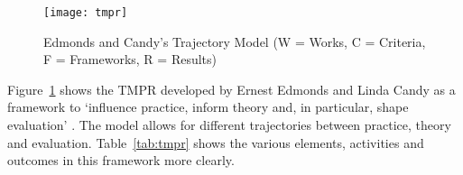 


\begin{figure}[!htbp] %
  \centering
  \texttt{[image: tmpr]}
  \caption[Trajectory Model]{Edmonds and Candy's Trajectory Model (W = Works, C = Criteria, F = Frameworks, R = Results)}
\label{fig:tmpr}
\end{figure}

Figure~\ref{fig:tmpr} shows the \ac{TMPR} developed by Ernest Edmonds and Linda Candy as a framework to `influence practice, inform theory and, in particular, shape evaluation' \autocite{Edmonds2010}. The model allows for different trajectories between practice, theory and evaluation. Table~\ref{tab:tmpr} shows the various elements, activities and outcomes in this framework more clearly.

